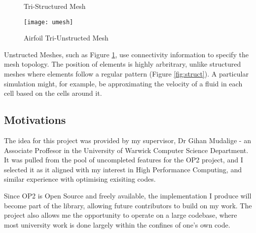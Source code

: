\begin{figure}[h!]
  \begin{minipage}{.5\textwidth}
    \centering
    \caption{Tri-Structured Mesh}
    \label{fig:struct}
  \end{minipage}
  \begin{minipage}{.5\textwidth}
    \centering
    \texttt{[image: umesh]}
    \caption{Airfoil Tri-Unstructed Mesh}
    \label{fig:umesh}
  \end{minipage}
\end{figure}
\par
Unstructed Meshes, such as Figure \ref{fig:umesh}, use connectivity information to specify the mesh topology. The position of elements is highly arbritrary, unlike structured meshes where elements follow a regular pattern (Figure \ref{fig:struct}). A particular simulation might, for example, be approximating the velocity of a fluid in each cell based on the cells around it.

\subsection{Motivations}
The idea for this project was provided by my supervisor, Dr Gihan Mudalige - an Associate Proffesor in the University of Warwick Computer Science Department. It was pulled from the pool of uncompleted features for the OP2 project, and I selected it as it aligned with my interest in High Performance Computing, and similar experience with optimising exisiting codes.
\par
Since OP2 is Open Source and freely available, the implementation I produce will become part of the library, allowing future contributors to build on my work. The project also allows me the opportunity to operate on a large codebase, where most university work is done largely within the confines of one's own code.
